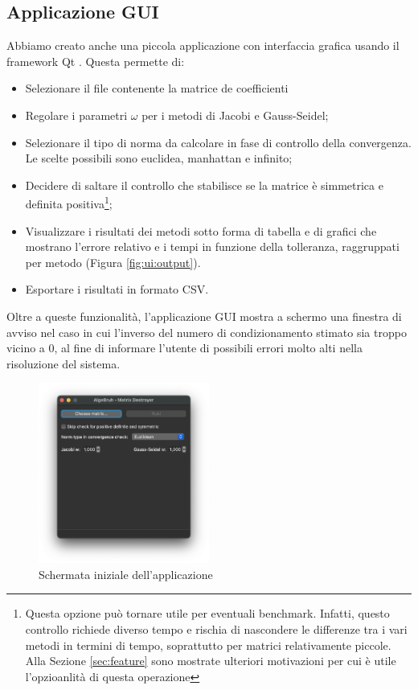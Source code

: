 \subsection{Applicazione GUI}
Abbiamo creato anche una piccola applicazione con interfaccia grafica usando il framework Qt \cite{Qt}. Questa permette di:
\begin{itemize}
	\item Selezionare il file contenente la matrice de coefficienti
	\item Regolare i parametri $\omega$ per i metodi di Jacobi e Gauss-Seidel;
	\item Selezionare il tipo di norma da calcolare in fase di controllo della convergenza. Le scelte possibili sono euclidea, manhattan e infinito;
	\item Decidere di saltare il controllo che stabilisce se la matrice è simmetrica e definita positiva\footnote{Questa opzione può tornare utile per eventuali benchmark. Infatti, questo controllo richiede diverso tempo e rischia di nascondere le differenze tra i vari metodi in termini di tempo, soprattutto per matrici relativamente piccole. Alla Sezione \ref{sec:feature} sono mostrate ulteriori motivazioni per cui è utile l'opzioanlità di questa operazione};
	\item Visualizzare i risultati dei metodi sotto forma di tabella e di grafici che mostrano l'errore relativo e i tempi in funzione della tolleranza, raggruppati per metodo (Figura \ref{fig:ui:output}).
	\item Esportare i risultati in formato CSV.
\end{itemize}

Oltre a queste funzionalità, l'applicazione GUI mostra a schermo una finestra di avviso nel caso in cui l'inverso del  numero di condizionamento stimato sia troppo vicino a 0, al fine di informare l'utente di possibili errori molto alti nella risoluzione del sistema.

\begin{figure}%
	\centering
	\includegraphics[width=0.5\textwidth]{figures/UI/main.png}
	\caption{Schermata iniziale dell'applicazione}%
	\label{fig:ui:main}%
\end{figure}

